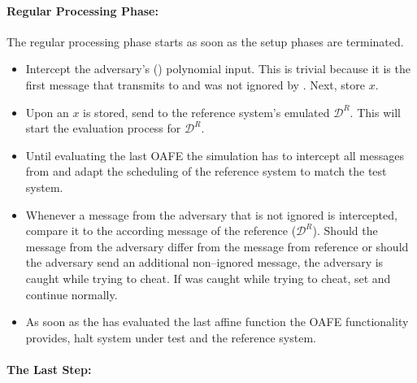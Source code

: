 \paragraph{Regular Processing Phase:}

The regular processing phase starts as soon as the setup phases are terminated.

\begin{itemize}

  \item Intercept the adversary's (\JWadv{}) polynomial input. This is trivial
    because it is the first message that \JWadv{} transmits to \JWfuncSymOAFE{}
    and was not ignored by \JWfuncSymOAFE{}. Next, store $x$.

  \item Upon an $x$ is stored, send  to the reference
    system's emulated \JWpTwo{} $\mathcal{D}^R$. This will start the evaluation
    process for $\mathcal{D}^R$.

  \item Until evaluating the last OAFE the simulation has to intercept all
    messages from \JWadv{} and adapt the scheduling of the reference system to
    match the test system.

  \item Whenever a message from the adversary \JWadv{} that is not ignored is
    intercepted, compare it to the according message of the reference \JWpTwo{}
    ($\mathcal{D}^R$). Should the message from the adversary differ from the
    message from reference \JWpTwo{} or should the adversary send an additional
    non--ignored message, the adversary is caught while trying to cheat. If
    \JWadv{} was caught while trying to cheat, set  and continue normally.

  \item As soon as the \JWadv{} has evaluated the last affine function the OAFE
    functionality provides, halt system under test and the reference system.

\end{itemize}

\paragraph{The Last Step:}

